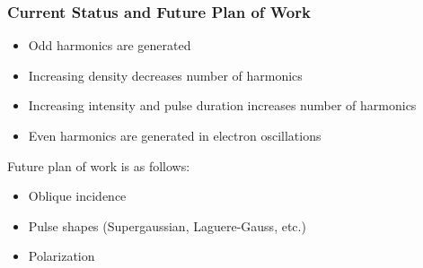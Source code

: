 \documentclass{beamer}
\begin{document}
\begin{frame}
    \frametitle{Current Status and Future Plan of Work}
    \begin{itemize}
        \item Odd harmonics are generated
        \item Increasing density decreases number of harmonics
        \item Increasing intensity and pulse duration increases number of harmonics
        \item Even harmonics are generated in electron oscillations
    \end{itemize}
    Future plan of work is as follows:
    \begin{itemize}
        \item Oblique incidence
        \item Pulse shapes (Supergaussian, Laguere-Gauss, etc.)
        \item Polarization
    \end{itemize}
\end{frame}

\end{document}
